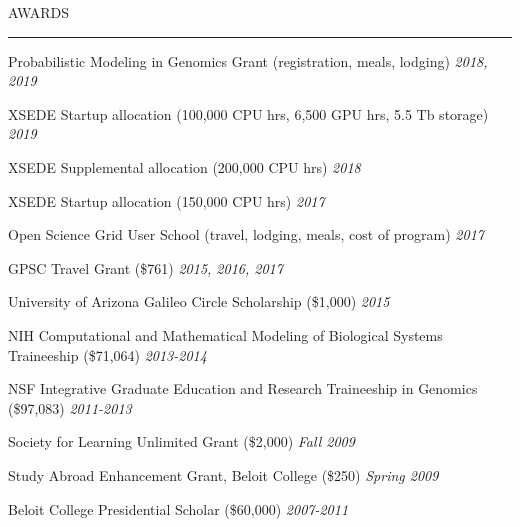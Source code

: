 \documentclass{resume} %
\renewenvironment{rSection}[1]{
\sectionskip
\textcolor{RoyalPurple}{\MakeUppercase{#1}}
\sectionlineskip
\hrule
\begin{list}{}{
\setlength{\leftmargin}{1.5em}
}
\item[]
}{
\end{list}
}
\begin{document}
\begin{rSection}{Awards}

\item Probabilistic Modeling in Genomics Grant (registration, meals, lodging) \hfill{\em 2018, 2019}
\item XSEDE Startup allocation (100,000 CPU hrs, 6,500 GPU hrs, 5.5 Tb storage) \hfill{\em 2019}
\item XSEDE Supplemental allocation (200,000 CPU hrs) \hfill{\em 2018}
\item XSEDE Startup allocation (150,000 CPU hrs) \hfill{\em 2017}
\item Open Science Grid User School (travel, lodging, meals, cost of program) \hfill{\em 2017}
\item GPSC Travel Grant (\$761) \hfill{\em 2015, 2016, 2017} 
\item University of Arizona Galileo Circle Scholarship (\$1,000) \hfill{\em 2015} 
\item NIH Computational and Mathematical Modeling of Biological Systems Traineeship (\$71,064) \hfill {\em 2013-2014}
\item NSF Integrative Graduate Education and Research Traineeship in Genomics (\$97,083) \hfill {\em 2011-2013}
\item Society for Learning Unlimited Grant (\$2,000) \hfill {\em Fall 2009}
\item Study Abroad Enhancement Grant, Beloit College (\$250) \hfill {\em Spring 2009}
\item Beloit College Presidential Scholar (\$60,000) \hfill {\em 2007-2011}

\end{rSection}

\end{document}
